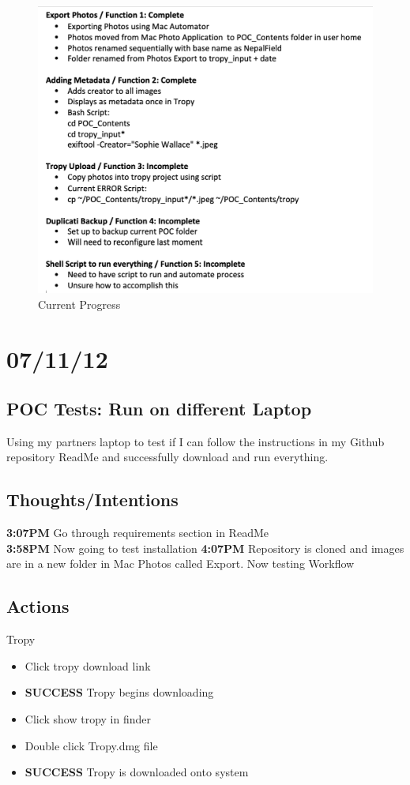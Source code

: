 \documentclass{article}
\begin{document}
\begin{figure}[H]
    \centering
    \includegraphics[width=\textwidth]{Images/Progress.png}
    \caption{Current Progress}
    \label{fig:my_label}
\end{figure}

\section{07/11/12}
\subsection{POC Tests: Run on different Laptop}
Using my partners laptop to test if I can follow the instructions in my Github repository ReadMe and successfully download and run everything.
\subsection{Thoughts/Intentions}
\textbf{3:07PM} Go through requirements section in ReadMe \\
\textbf{3:58PM} Now going to test installation 
\textbf{4:07PM} Repository is cloned and images are in a new folder in Mac Photos called Export. Now testing Workflow

\subsection{Actions}
Tropy
\begin{itemize}
\item Click tropy download link
\item \textbf{SUCCESS} Tropy begins downloading
\item Click show tropy in finder
\item Double click Tropy.dmg file
\item \textbf{SUCCESS} Tropy is downloaded onto system
\end{itemize}
\end{document}

